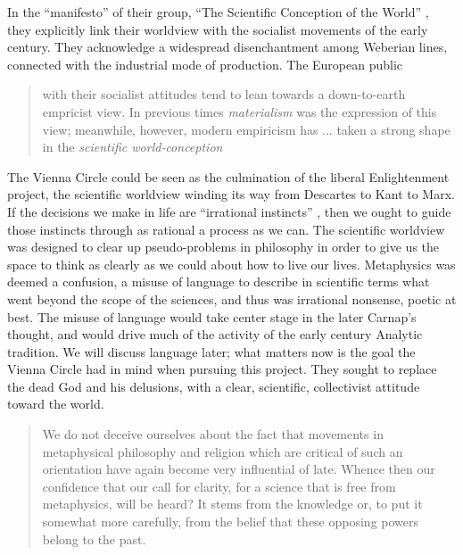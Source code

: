 \documentclass[leqno, 12pt]{turabian-researchpaper}
\begin{document}
	In the \enquote{manifesto} of their group, \enquote{The Scientific Conception of the World}
	\autocite{hahn1973}, they explicitly link their worldview with the socialist movements
	of the early  century. They acknowledge a widespread disenchantment among
	Weberian lines, connected with the industrial mode of production. The European
	public \blockquote[{\cite[pp. 21-22]{hahn1973}}]{with their socialist attitudes tend to lean towards a down-to-earth empricist view. In previous times \emph{materialism} was the expression of this view; meanwhile, however, modern empiricism has ... taken a strong shape in the \emph{scientific world-conception}}.

	The Vienna Circle could be seen as the culmination of the liberal Enlightenment
	project, the scientific worldview winding its way from Descartes to Kant to
	Marx. If the decisions we make in life are \enquote{irrational instincts}
	\autocite[{p. 4}]{carnap1929}, then we ought to guide those instincts through as
	rational a process as we can. The scientific worldview was designed to clear
	up pseudo-problems in philosophy in order to give us the space to think as
	clearly as we could about how to live our lives. Metaphysics was deemed a confusion,
	a misuse of language to describe in scientific terms what went beyond the
	scope of the sciences, and thus was irrational nonsense, poetic at best. The misuse
	of language would take center stage in the later Carnap's thought, and would
	drive much of the activity of the early  century Analytic tradition.
	We will discuss language later; what matters now is the goal the Vienna Circle
	had in mind when pursuing this project. They sought to replace the dead God
	and his delusions, with a clear, scientific, collectivist attitude toward the world.

	\blockquote[{\cite[xvii-xviii]{carnap2003}}]{We do not deceive ourselves about the fact that movements in metaphysical philosophy and religion which are critical of such an orientation have again become very influential of late. Whence then our confidence that our call for clarity, for a science that is free from metaphysics, will be heard? It stems from the knowledge or, to put it somewhat more carefully, from the belief that these opposing powers belong to the past.}
\end{document}
